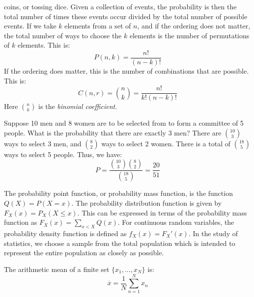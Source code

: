 \documentclass[crop=false,class=book,oneside]{standalone}
\begin{document}
        coins, or tossing dice. Given a collection of events, the probability
        is then the total number of times these events occur divided by
        the total number of possible events. If we take $k$ elements from
        a set of $n$, and if the ordering does not matter, the total number of
        ways to choose the $k$ elements is the number of permutations of $k$
        elements. This is:
        \begin{equation*}
            P(n,k)=\frac{n!}{(n-k)!}
        \end{equation*}
        If the ordering does matter, this is the number of combinations
        that are possible. This is:
        \begin{equation*}
            C(n,r)=\binom{n}{k}=\frac{n!}{k!(n-k)!}
        \end{equation*}
        Here $\binom{n}{k}$ is the \textit{binomial coefficient}.
        \begin{example}
            Suppose 10 men and 8 women are to be selected from to form
            a committee of 5 people. What is the probability that there
            are exactly 3 men? There are $\binom{10}{3}$ ways to
            select 3 men, and $\binom{8}{2}$ ways to select 2 women.
            There is a total of $\binom{18}{5}$ ways to select 5 people.
            Thus, we have:
            \begin{equation*}
                P=\frac{\binom{10}{3}\binom{8}{2}}{\binom{18}{5}}
                =\frac{20}{51}
            \end{equation*}
        \end{example}
        The probability point function, or probability mass function,
        is the function $Q(X)=P(X=x)$. The probability distribution
        function is given by
        $F_{X}(x)=P_{X}(X\leq{x})$. This can be expressed in
        terms of the probability mass function as
        $F_{X}(x)=\sum_{x<X}Q(x)$. For continuous random variables,
        the probability density function is defined as
        $f_{X}(x)=F_{X}'(x)$. In the study of statistics, we choose a sample
        from the total population which is intended to represent the
        entire population as closely as possible.
        \begin{definition}
            The arithmetic mean of a finite set
            $\{x_{1},\hdots,x_{N}\}$ is:
            \begin{equation*}
                \overline{x}=\frac{1}{N}\sum_{n=1}^{N}x_{n}
            \end{equation*}
        \end{definition}
\end{document}
